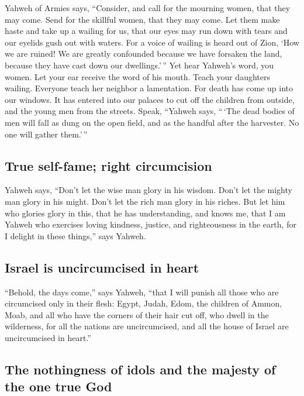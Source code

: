  Yahweh of Armies says, ``Consider, and call for the
mourning women, that they may come. Send for the skillful women, that
they may come.  Let them make haste and take up a wailing
for us, that our eyes may run down with tears and our eyelids gush out
with waters.  For a voice of wailing is heard out of
Zion, `How we are ruined! We are greatly confounded because we have
forsaken the land, because they have cast down our dwellings.'\,''
 Yet hear Yahweh's word, you women. Let your ear receive
the word of his mouth. Teach your daughters wailing. Everyone teach her
neighbor a lamentation.  For death has come up into our
windows. It has entered into our palaces to cut off the children from
outside, and the young men from the streets.  Speak,
``Yahweh says, ``\,`The dead bodies of men will fall as dung on the open
field, and as the handful after the harvester. No one will gather
them.'\,''

\hypertarget{true-self-fame-right-circumcision}{%
\subsection{True self-fame; right
circumcision}\label{true-self-fame-right-circumcision}}

 Yahweh says, ``Don't let the wise man glory in his
wisdom. Don't let the mighty man glory in his might. Don't let the rich
man glory in his riches.  But let him who glories glory
in this, that he has understanding, and knows me, that I am Yahweh who
exercises loving kindness, justice, and righteousness in the earth, for
I delight in these things,'' says Yahweh.

\hypertarget{israel-is-uncircumcised-in-heart}{%
\subsection{Israel is uncircumcised in
heart}\label{israel-is-uncircumcised-in-heart}}

 ``Behold, the days come,'' says Yahweh, ``that I will
punish all those who are circumcised only in their flesh:
 Egypt, Judah, Edom, the children of Ammon, Moab, and all
who have the corners of their hair cut off, who dwell in the wilderness,
for all the nations are uncircumcised, and all the house of Israel are
uncircumcised in heart.''

\hypertarget{the-nothingness-of-idols-and-the-majesty-of-the-one-true-god}{%
\subsection{The nothingness of idols and the majesty of the one true
God}\label{the-nothingness-of-idols-and-the-majesty-of-the-one-true-god}}

